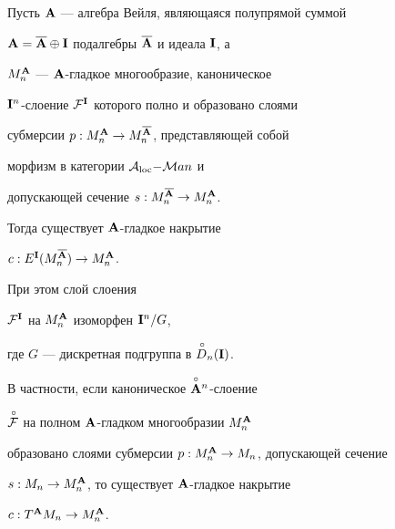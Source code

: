 \begin{thm}


Пусть ${\bold A}$ --- алгебра Вейля, являющаяся полупрямой суммой


${\bold A}=\overline{{\bold A}}\oplus{\bold I}$ подалгебры $\overline{{\bold A}}$ и идеала ${\bold I}$, а


$M^{\bold A}_n$ --- ${\bold A}$-гладкое многообразие, каноническое


${\bold I}^n$-слоение ${\cal F}^{\bold I}$ которого полно и образовано слоями


субмерсии $p:M_n^{\bold A}\to M_n^{\overline{{\bold A}}}$, представляющей собой


морфизм в категории ${\cal A}_{\operatorname{loc}}{-}{\cal M}an$ и


допускающей сечение $s:M_n^{\overline{{\bold A}}}\to M^{\bold A}_n$.


Тогда существует ${\bold A}$-гладкое накрытие


$c:E^{\bold I}(M_n^{\overline{{\bold A}}})\to M_n^{\bold A}$.


При этом слой слоения


${\cal F}^{\bold I}$ на $M_n^{\bold A}$ изоморфен ${\bold I}^n/G$,


где $G$ --- дискретная подгруппа в ${\overset{\,\circ}{D}{}}{}_n({\bold I})$.


 


В частности, если каноническое $\overset{\circ}{{\bold A}}{}^n$-слоение


$\overset{\,\circ}{\cal F}{}$ на полном ${\bold A}$-гладком многообразии $M^{\bold A}_n$


образовано слоями субмерсии $p:M^{\bold A}_n\to M_n$, допускающей сечение


$s:M_n\to M^{\bold A}_n$, то существует ${\bold A}$-гладкое накрытие


$c:T^{\bold A} M_n\to M^{\bold A}_n$.


\end{thm}


 





